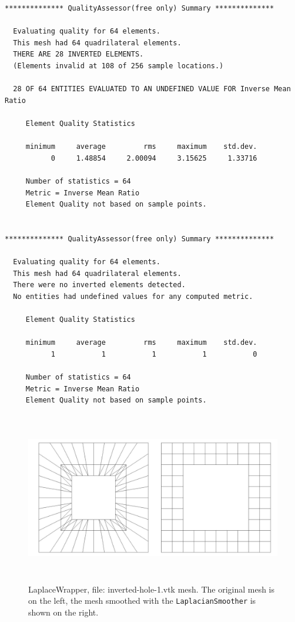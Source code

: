 \begin{verbatim}
************** QualityAssessor(free only) Summary **************

  Evaluating quality for 64 elements.
  This mesh had 64 quadrilateral elements.
  THERE ARE 28 INVERTED ELEMENTS.
  (Elements invalid at 108 of 256 sample locations.)

  28 OF 64 ENTITIES EVALUATED TO AN UNDEFINED VALUE FOR Inverse Mean Ratio

     Element Quality Statistics

     minimum     average         rms     maximum    std.dev.
           0     1.48854     2.00094     3.15625     1.33716

     Number of statistics = 64
     Metric = Inverse Mean Ratio
     Element Quality not based on sample points.


************** QualityAssessor(free only) Summary **************

  Evaluating quality for 64 elements.
  This mesh had 64 quadrilateral elements.
  There were no inverted elements detected.
  No entities had undefined values for any computed metric.

     Element Quality Statistics

     minimum     average         rms     maximum    std.dev.
           1           1           1           1           0

     Number of statistics = 64
     Metric = Inverse Mean Ratio
     Element Quality not based on sample points.
\end{verbatim}
\begin{figure}[htbp]
\begin{center}
    \includegraphics[height=75mm]{figures/inverted-hole-1}
    \caption{LaplaceWrapper, file: inverted-hole-1.vtk mesh. The original mesh is on the left, the mesh smoothed with the \texttt{LaplacianSmoother} is shown on the right.}
    \label{fig:inverted_hole_1}
\end{center}
\end{figure}

